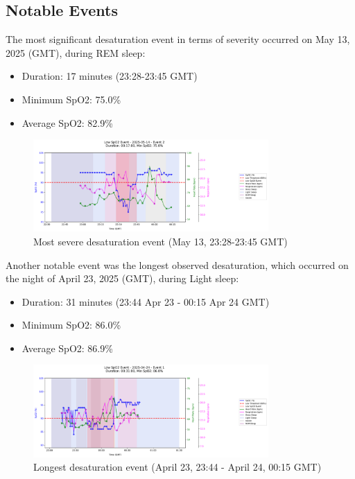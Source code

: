 \documentclass{article}
\begin{document}
\subsection{Notable Events}
The most significant desaturation event in terms of severity occurred on May 13, 2025 (GMT), during REM sleep:
\begin{itemize}
    \item Duration: 17 minutes (23:28-23:45 GMT)
    \item Minimum SpO2: 75.0\%
    \item Average SpO2: 82.9\%
\end{itemize}

\begin{figure}[htbp]
    \centering
    \includegraphics[width=0.8\textwidth]{images/2025-05-14_event_2.png}
    \caption{Most severe desaturation event (May 13, 23:28-23:45 GMT)}
    \label{fig:severe_event}
\end{figure}

Another notable event was the longest observed desaturation, which occurred on the night of April 23, 2025 (GMT), during Light sleep:
\begin{itemize}
    \item Duration: 31 minutes (23:44 Apr 23 - 00:15 Apr 24 GMT)
    \item Minimum SpO2: 86.0\%
    \item Average SpO2: 86.9\%
\end{itemize}

\begin{figure}[htbp]
    \centering
    \includegraphics[width=0.8\textwidth]{images/2025-04-24_event_1.png}
    \caption{Longest desaturation event (April 23, 23:44 - April 24, 00:15 GMT)}
    \label{fig:longest_event}
\end{figure}
\end{document}
